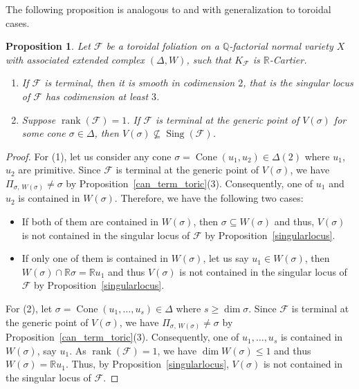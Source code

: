 \documentclass[12pt,reqno]{amsart}
\newtheorem{proposition}[theorem]{Proposition}
\theoremstyle{definition}
\newcommand{\on}{\operatorname}
\newcommand\cF{{\mathcal{F}}}
\newcommand\bQ{{\mathbb Q}}
\newcommand\bR{{\mathbb R}}
\begin{document}
The following proposition is analogous to \cite[Theorem 0.2]{spicer2022local} and \cite[Lemma 2.9]{cascini2025mmp} with generalization to toroidal cases. 
\begin{proposition}
     Let $\cF$ be a toroidal foliation on a $\bQ$-factorial normal variety $X$ with associated extended complex $(\Delta,W)$, such that $K_\cF$ is $\bR$-Cartier. 
    \begin{enumerate}
        \item If $\cF$ is terminal, then it is smooth in codimension $2$, that is the singular locus of $\cF$ has codimension at least $3$. 
        \item Suppose $\on{rank}(\cF)=1$. 
        If $\cF$ is terminal at the generic point of $V(\sigma)$ for some cone $\sigma\in\Delta$, then $V(\sigma)\nsubseteq\on{Sing}(\cF)$. 
    \end{enumerate}
\end{proposition}
\begin{proof}
    For (1), let us consider any cone $\sigma=\on{Cone}(u_1,u_2)\in\Delta(2)$ where $u_1$, $u_2$ are primitive. 
    Since $\cF$ is terminal at the generic point of $V(\sigma)$, we have $\Pi_{\sigma,\,W(\sigma)}\neq\sigma$ by Proposition~\ref{can_term_toric}(3). 
    Consequently, one of $u_1$ and $u_2$ is contained in $W(\sigma)$. 
    Therefore, we have the following two cases:
    \begin{itemize}
        \item If both of them are contained in $W(\sigma)$, then $\sigma\subseteq W(\sigma)$ and thus, $V(\sigma)$ is not contained in the singular locus of $\cF$ by Proposition~\ref{singularlocus}. 
        \item If only one of them is contained in $W(\sigma)$, let us say $u_1\in W(\sigma)$, then $W(\sigma)\cap\bR\sigma=\bR u_1$ and thus $V(\sigma)$ is not contained in the singular locus of $\cF$ by Proposition~\ref{singularlocus}. 
    \end{itemize}

    For (2), let $\sigma=\on{Cone}(u_1,\ldots,u_s)\in\Delta$ where $s\geq\dim\sigma$. 
    Since $\cF$ is terminal at the generic point of $V(\sigma)$, we have $\Pi_{\sigma,\,W(\sigma)}\neq\sigma$ by Proposition~\ref{can_term_toric}(3). 
    Consequently, one of $u_1,\ldots,u_s$ is contained in $W(\sigma)$, say $u_1$. 
    As $\on{rank}(\cF)=1$, we have $\dim W(\sigma)\leq 1$ and thus $W(\sigma)=\bR u_1$. 
    Thus, by Proposition~\ref{singularlocus}, $V(\sigma)$ is not contained in the singular locus of $\cF$. 
\end{proof}
\end{document}
